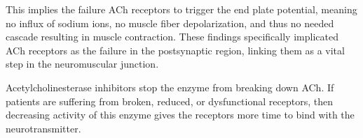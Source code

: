 \documentclass[basic]{inVerba-notes}
\begin{document}
\begin{enumerate}
  This implies the failure ACh receptors to trigger the end plate potential, meaning no influx of sodium ions, no muscle fiber depolarization, and thus no needed cascade resulting in muscle contraction. These findings specifically implicated ACh receptors as the failure in the postsynaptic region, linking them as a vital step in the neuromuscular junction. 


  Acetylcholinesterase inhibitors stop the enzyme from breaking down ACh. If patients are suffering from broken, reduced, or dysfunctional receptors, then decreasing activity of this enzyme gives the receptors more time to bind with the neurotransmitter. 
\end{enumerate}
\end{document}
